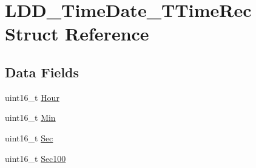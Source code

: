 \hypertarget{struct_l_d_d___time_date___t_time_rec}{\section{L\-D\-D\-\_\-\-Time\-Date\-\_\-\-T\-Time\-Rec Struct Reference}
\label{struct_l_d_d___time_date___t_time_rec}
}
\subsection*{Data Fields}
\begin{DoxyCompactItemize}
\item 
uint16\-\_\-t \hyperlink{struct_l_d_d___time_date___t_time_rec_ac741c5c14148b2d360bb09fedc6ebabd}{Hour}
\item 
uint16\-\_\-t \hyperlink{struct_l_d_d___time_date___t_time_rec_a7cea2c409e90bccdc33f19b093020373}{Min}
\item 
uint16\-\_\-t \hyperlink{struct_l_d_d___time_date___t_time_rec_a05cccc86e89e5704b0460caaf2429f75}{Sec}
\item 
uint16\-\_\-t \hyperlink{struct_l_d_d___time_date___t_time_rec_a2cd2e13e7c478f04ea1c4c460b104491}{Sec100}
\end{DoxyCompactItemize}


